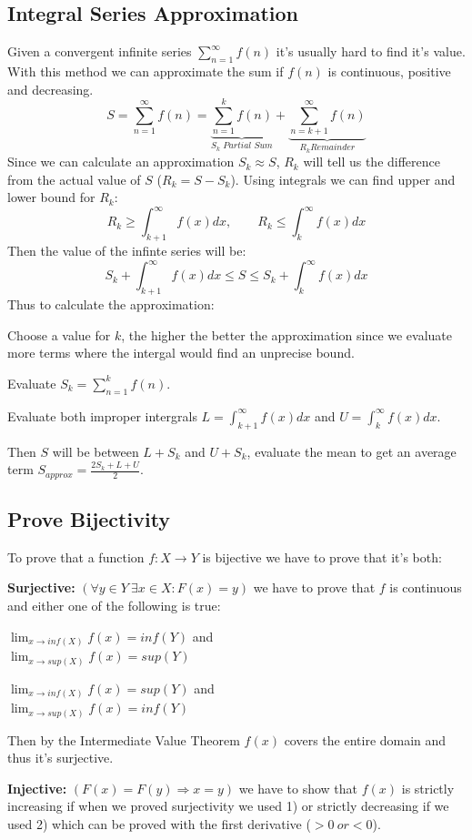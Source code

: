 \documentclass[8pt,a4paper]{extarticle}     %
\theoremstyle{definition}
\theoremstyle{definition}
\theoremstyle{definition}
\begin{document}
\begin{multicols}{4}
\vfill\null
\columnbreak
\subsection{Integral Series Approximation}
Given a convergent infinite series $\sum_{n=1}^{\infty} f(n)$ it's usually hard to find it's value. With this method we can approximate the sum if $f(n)$ is continuous, positive and decreasing.
$$S = \sum_{n=1}^{\infty} f(n) = \underbrace{\sum_{n=1}^{k}f(n)}_{S_k \textit{ Partial Sum}} + \underbrace{\sum_{n=k+1}^{\infty} f(n)}_{R_k \textit{Remainder}}$$
Since we can calculate an approximation $S_k \approx S$, $R_k$ will tell us the difference from the actual value of $S$ ($R_k = S-S_k$). Using integrals we can find upper and lower bound for $R_k$:
$$R_k \geq \int_{k+1}^{\infty}f(x)dx, \qquad R_k \leq \int_{k}^{\infty}f(x)dx$$
Then the value of the infinte series will be:
$$ S_k + \int_{k+1}^{\infty}f(x)dx \leq S \leq S_k + \int_{k}^{\infty}f(x)dx$$
Thus to calculate the approximation:
\begin{numberlist}
	\item Choose a value for $k$, the higher the better the approximation since we evaluate more terms where the intergal would find an unprecise bound.
	\item Evaluate $S_k = \sum_{n=1}^{k}f(n)$.
	\item Evaluate both improper intergrals $L = \int_{k+1}^{\infty}f(x)dx$ and $U = \int_{k}^{\infty}f(x)dx$.
	\item Then $S$ will be between $L + S_k$ and $U + S_k$, evaluate the mean to get an average term $S_{\textit{approx}} = \frac{2S_k+L+U}{2}$.
\end{numberlist}
\subsection{Prove Bijectivity}
To prove that a function $f: X\rightarrow Y$ is bijective we have to prove that it's both:
\begin{bulletlist}
	\item \textbf{Surjective:} $(\forall y\in Y \ \exists x\in X: F(x) = y)$ we have to prove that $f$ is continuous and either one of the following is true:
	\begin{numberlist}
		\item $\lim_{x\to inf(X)} f(x) = inf(Y)$ and \\$\lim_{x\to sup(X)} f(x) = sup(Y)$
		\item $\lim_{x\to inf(X)} f(x) = sup(Y)$ and \\$\lim_{x\to sup(X)} f(x) = inf(Y)$
	\end{numberlist}
	Then by the Intermediate Value Theorem $f(x)$ covers the entire domain and thus it's surjective.
	\item \textbf{Injective:} $(F(x) = F(y) \Rightarrow x = y)$ we have to show that $f(x)$ is strictly increasing if when we proved surjectivity we used 1) or strictly decreasing if we used 2) which can be proved with the first derivative ($> 0 \ or < 0$).
\end{bulletlist}

\end{multicols}
\end{document}
